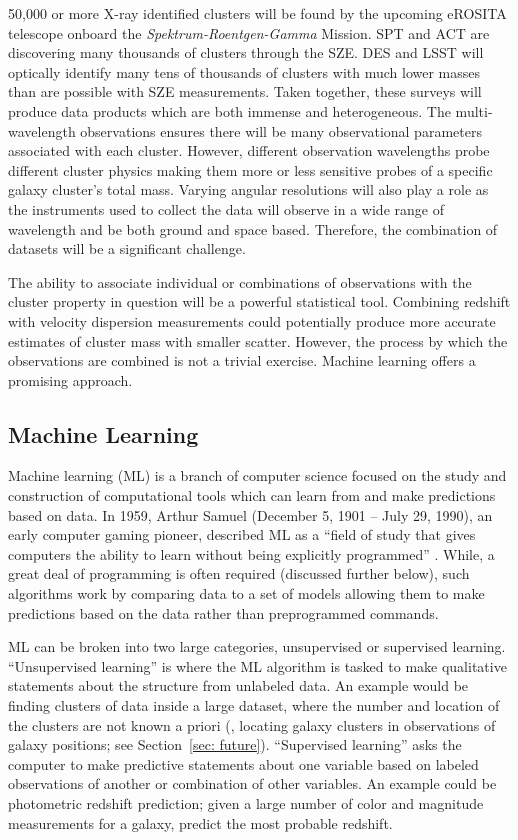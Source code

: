 50,000 or more X-ray identified clusters will be found by the upcoming eROSITA telescope onboard the \emph{Spektrum-Roentgen-Gamma} Mission. SPT and ACT are discovering many thousands of clusters through the SZE. DES and LSST will optically identify many tens of thousands of clusters with much lower masses than are possible with SZE measurements. Taken together, these surveys will produce data products which are both immense and heterogeneous. The multi-wavelength observations ensures there will be many observational parameters associated with each cluster. However, different observation wavelengths probe different cluster physics making them more or less sensitive probes of a specific galaxy cluster's total mass. Varying angular resolutions will also play a role as the instruments used to collect the data will observe in a wide range of wavelength and be both ground and space based. Therefore, the combination of datasets will be a significant challenge.

The ability to associate individual or combinations of observations with the cluster property in question will be a powerful statistical tool. Combining redshift with velocity dispersion measurements could potentially produce more accurate estimates of cluster mass with smaller scatter. However, the process by which the observations are combined is not a trivial exercise. Machine learning offers a promising approach.

\subsection{Machine Learning}
Machine learning (ML) is a branch of computer science focused on the study and construction of computational tools which can learn from and make predictions based on data. In 1959, Arthur Samuel (December 5, 1901 -- July 29, 1990), an early computer gaming pioneer, described ML as a ``field of study that gives computers the ability to learn without being explicitly programmed'' \citep{simon2013}. While, a great deal of programming is often required (discussed further below), such algorithms work by comparing data to a set of models allowing them to make predictions based on the data rather than preprogrammed commands.

ML can be broken into two large categories, unsupervised or supervised learning. ``Unsupervised learning'' is where the ML algorithm is tasked to make qualitative statements about the structure from unlabeled data. An example would be finding clusters of data inside a large dataset, where the number and location of the clusters are not known a priori (\eg, locating galaxy clusters in observations of galaxy positions; see Section~\ref{sec: future}). ``Supervised learning''  asks the computer to make predictive statements about one variable based on labeled observations of another or combination of other variables. An example could be photometric redshift prediction; given a large number of color and magnitude measurements for a galaxy, predict the most probable redshift.  

